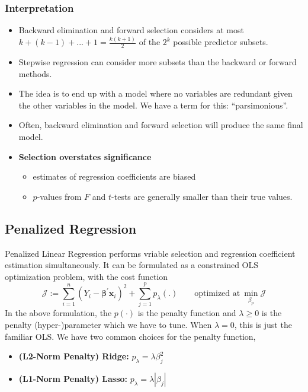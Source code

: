 \documentclass[10pt]{article}
\begin{document}
\subsubsection{Interpretation} 
\begin{itemize}
    \item Backward elimination and forward selection considers at most $k + (k - 1) + ... + 1 = \frac{k(k+1)}{2}$ of the $2^k$ possible predictor subsets.
    \item Stepwise regression can consider more subsets than the backward or forward methods.
    \item The idea is to end up with a model where no variables are redundant given the other variables in the model. We have a term for this: ``parsimonious''. 
    \item Often, backward elimination and forward selection will produce the same final model.
    \item \textbf{Selection overstates significance}
    \begin{itemize}
        \item estimates of regression coefficients are biased
        \item $p$-values from $F$ and $t$-tests are generally smaller than their true values. 
    \end{itemize}
\end{itemize}

\subsection{Penalized Regression}
Penalized Linear Regression performs vriable selection and regression coefficient estimation simultaneously. It can be formulated as a constrained OLS optimization problem, with the cost function
\begin{equation*}
    \mathcal{J}:= \sum_{i=1}^{n}\left(Y_{i}-\boldsymbol{\beta}^{\prime} \mathbf{x}_{i}\right)^{2}+\sum_{j=1}^{p} p_{\lambda}(.) \quad \quad \text{optimized at}~\min_{\beta_p} \mathcal{J}
\end{equation*}
In the above formulation, the $p(\cdot)$ is the penalty function and $\lambda \geq 0$ is the penalty (hyper-)parameter which we have to tune. When $\lambda = 0$, this is just the familiar OLS. We have two common choices for the penalty function,
\begin{itemize}
    \item \textbf{(L2-Norm Penalty) Ridge:} $p_{\lambda}=\lambda \beta_{j}^{2}$
    \item \textbf{(L1-Norm Penalty) Lasso:} $p_{\lambda}=\lambda\left|\beta_{j}\right|$
\end{itemize}
\end{document}
